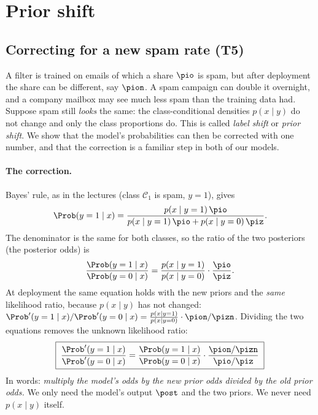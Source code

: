 \section{Prior shift}
\label{sec:prior-shift}

\subsection{Correcting for a new spam rate (T5)}
\label{sec:t5}

A filter is trained on emails of which a share $\pio$ is spam, but after deployment the share can be
different, say $\pion$. A spam campaign can double it overnight, and a company mailbox may see much less
spam than the training data had. Suppose spam still \emph{looks} the same: the class-conditional densities
$p(x\mid y)$ do not change and only the class proportions do. This is called \emph{label shift} or
\emph{prior shift}. We show that the model's probabilities can then be corrected with one number, and that
the correction is a familiar step in both of our models.

\paragraph{The correction.}
Bayes' rule, as in the lectures (class $\mathcal C_1$ is spam, $y=1$), gives
\[
  \Prob(y=1\mid x) = \frac{p(x\mid y=1)\,\pio}{p(x\mid y=1)\,\pio + p(x\mid y=0)\,\piz}.
\]
The denominator is the same for both classes, so the ratio of the two posteriors (the posterior odds) is
\begin{equation}
  \frac{\Prob(y=1\mid x)}{\Prob(y=0\mid x)} = \frac{p(x\mid y=1)}{p(x\mid y=0)}\cdot\frac{\pio}{\piz}.
  \label{eq:t5-odds-train}
\end{equation}
At deployment the same equation holds with the new priors and the \emph{same} likelihood ratio, because
$p(x\mid y)$ has not changed:
$\Prob'(y=1\mid x)/\Prob'(y=0\mid x) = \frac{p(x\mid y=1)}{p(x\mid y=0)}\cdot\pion/\pizn$.
Dividing the two equations removes the unknown likelihood ratio:
\begin{equation}
  \boxed{\;\frac{\Prob'(y=1\mid x)}{\Prob'(y=0\mid x)}
  = \frac{\Prob(y=1\mid x)}{\Prob(y=0\mid x)}\cdot\frac{\pion/\pizn}{\pio/\piz}\;}
  \label{eq:t5-odds}
\end{equation}
In words: \emph{multiply the model's odds by the new prior odds divided by the old prior odds.} We only
need the model's output $\post$ and the two priors. We never need $p(x\mid y)$ itself.

